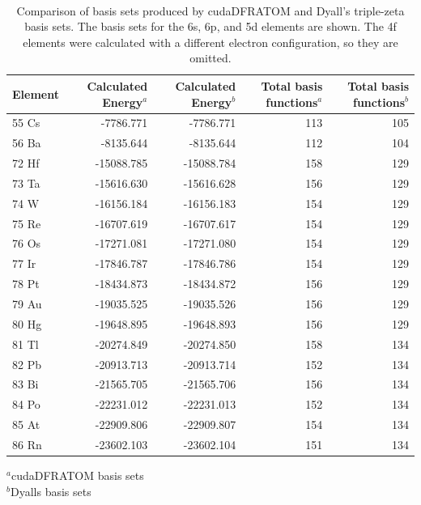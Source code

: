\begin{table}
\caption[Comparison of basis sets produced by cudaDFRATOM and Dyall's triple-zeta basis sets.]{Comparison of basis sets produced by cudaDFRATOM and Dyall's triple-zeta basis sets. The basis sets for the 6s\cite{dyall_s}, 6p\cite{dyall_p}, and 5d\cite{dyall_d} elements are shown. The 4f elements were calculated with a different electron configuration, so they are omitted.} 
\label{tab:dyall_comp} \\
\begin{tabular}{l r r r r}
\toprule
  Element	  &	Calculated Energy$^{a}$ & Calculated Energy$^{b}$ & Total basis functions$^{a}$ & Total basis functions$^{b}$ 	      \\
\midrule
55 Cs &	-7786.771            &  -7786.771              & 113                         & 105  \\
56 Ba &	-8135.644            &  -8135.644              & 112                         & 104  \\
72 Hf &	-15088.785            & -15088.784              & 158                         & 129   \\
73 Ta &   -15616.630            & -15616.628              & 156                         & 129   \\
74 W &   -16156.184            & -16156.183              & 154                         & 129   \\
75 Re &   -16707.619            & -16707.617              & 154                         & 129   \\
76 Os &   -17271.081            & -17271.080              & 154                         & 129   \\
77 Ir &   -17846.787            & -17846.786              & 154                         & 129   \\
78 Pt	 &   -18434.873            & -18434.872              & 156                         & 129   \\
79 Au &   -19035.525            & -19035.526              & 156                         & 129   \\
80 Hg &   -19648.895            & -19648.893              & 156                         & 129   \\
81 Tl &   -20274.849            & -20274.850              & 158                         & 134   \\
82 Pb &   -20913.713            & -20913.714              & 152                         & 134   \\
83 Bi &   -21565.705            & -21565.706              & 156                         & 134   \\
84 Po &   -22231.012            & -22231.013              & 152                         & 134   \\
85 At &   -22909.806            & -22909.807              & 154                         & 134   \\
86 Rn &   -23602.103            & -23602.104              & 151                         & 134   \\
\bottomrule
\end{tabular}
  $^{a}$cudaDFRATOM basis sets	\\
  $^{b}$Dyalls basis sets
\end{table}


